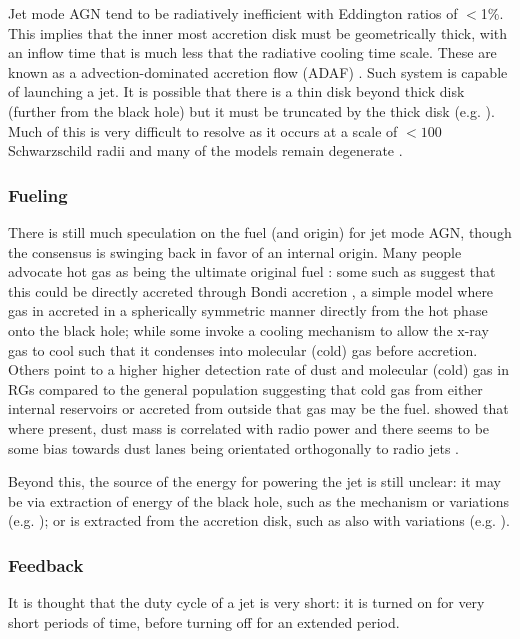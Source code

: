 		Jet mode AGN tend to be radiatively inefficient with Eddington ratios of $<$1\%. This implies that the inner most accretion disk must be geometrically thick, with an inflow time that is much less that the radiative cooling time scale. These are known as a advection-dominated accretion flow (ADAF) \citep{Narayan1994}. Such system is capable of launching a jet. It is possible that there is a thin disk beyond thick disk (further from the black hole) but it must be truncated by the thick disk (e.g. \citet{Abramowicz2002, Sadler2014}). Much of this is very difficult to resolve as it occurs at a scale of $< 100$ Schwarzschild radii and many of the models remain degenerate \citep{Quataert1999}. 

		\subsubsection{Fueling}
			\label{subsubsec:JetFueling}
			There is still much speculation on the fuel (and origin) for jet mode AGN, though the consensus is swinging back in favor of an internal origin. Many people advocate hot gas as being the ultimate original fuel \citep{Allen2006}: some such as \citet{Hardcastle2007a} suggest that this could be directly accreted through Bondi accretion \citep{Bondi1952}, a simple model where gas in accreted in a spherically symmetric manner directly from the hot phase onto the black hole; while some invoke a cooling mechanism to allow the x-ray gas to cool such that it condenses into molecular (cold) gas before accretion. Others point to a higher higher detection rate of dust and molecular (cold) gas in RGs compared to the general population \citep{Lim2000, Lim2003, DeRuiter2002, VerdoesKleijn2005} suggesting that cold gas from either internal reservoirs or accreted from outside that gas may be the fuel. \citet{DeRuiter2002} showed that where present, dust mass is correlated with radio power and there seems to be some bias towards dust lanes being orientated orthogonally to radio jets \citep{VerdoesKleijn2005}. 

			Beyond this, the source of the energy for powering the jet is still unclear: it may be via extraction of energy of the black hole, such as the \citet{Blandford1977} mechanism or variations (e.g. \citet{Koide2002}); or is extracted from the accretion disk, such as \citet{Blandford1982} also with variations (e.g. \citet{Hujeirat2003}). 

		\subsubsection{Feedback}
			\label{subsubsection:JetFeedback}
			It is thought that the duty cycle of a jet is very short: it is turned on for very short periods of time, before turning off for an extended period. 

